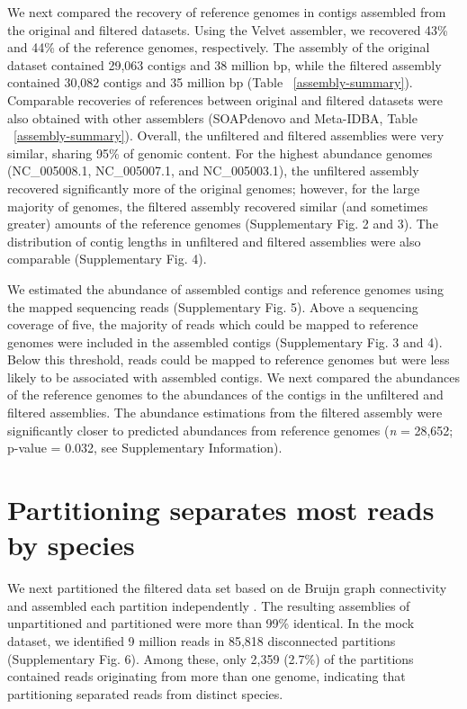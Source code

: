 \documentclass{nature}%
\begin{document}
We next compared the recovery of reference genomes in contigs
assembled from the original and filtered datasets.  Using the Velvet
assembler, we recovered 43\% and 44\% of the reference genomes, respectively.  The
assembly of the original dataset contained 29,063 contigs and 38
million bp, while the filtered assembly contained 30,082 contigs and
35 million bp (Table ~\ref{assembly-summary}).  Comparable recoveries
of references between original and filtered datasets were also
obtained with other assemblers (SOAPdenovo and Meta-IDBA, 
Table ~\ref{assembly-summary}).  Overall,
the unfiltered and filtered assemblies were very similar, sharing 95\%
of genomic content.  For the highest abundance genomes
(NC\_005008.1, NC\_005007.1, and
NC\_005003.1), the unfiltered assembly recovered
significantly more of the original genomes; however, for the large
majority of genomes, the filtered assembly recovered similar (and
sometimes greater) amounts of the reference genomes (Supplementary Fig. 2 and
3).  The distribution of contig lengths in unfiltered and filtered
assemblies were also comparable (Supplementary Fig. 4).

We estimated the abundance of assembled contigs and reference genomes
using the mapped sequencing reads (Supplementary Fig. 5).  Above a
sequencing coverage of five, the majority of reads which could be
mapped to reference genomes were included in the assembled contigs
(Supplementary Fig. 3 and 4).  Below this threshold, reads could be mapped to
reference genomes but were less likely to be associated with assembled
contigs.  We next compared the abundances of the reference genomes to
the abundances of the contigs in the unfiltered and filtered
assemblies.  The abundance estimations from the filtered assembly were
significantly closer to predicted abundances from reference genomes
(\emph{n} = 28,652; p-value = 0.032, see Supplementary Information).

\section*{Partitioning separates most reads by species}

We next partitioned the filtered data set based on de Bruijn graph
connectivity and assembled each partition independently
\cite{howeartifacts, Pell:2012cq}. The resulting assemblies of
unpartitioned and partitioned were more than 99\% identical.  In the
mock dataset, we identified 9 million reads in 85,818 disconnected
partitions (Supplementary Fig. 6).  Among these, only 2,359 (2.7\%) of the
partitions contained reads originating from more than one genome,
indicating that partitioning separated reads from distinct
species.
\end{document}
